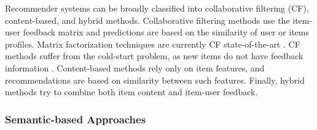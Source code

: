 Recommender systems can be broadly classified into collaborative filtering (CF), content-based, and hybrid methods. Collaborative filtering methods \citep{Koren2009} use the item-user feedback matrix and predictions are based on the similarity of user or items profiles. Matrix factorization techniques are currently CF state-of-the-art \citep{Koren2009}. 
CF methods suffer from the cold-start problem, as new items do not have feedback information \citep{Saveski2014}. Content-based methods \citep{Mooney1999} rely only on item features, and recommendations are based on similarity between such features. Finally, hybrid methods \citep{Burke2002} try to combine both item content and item-user feedback.


\subsubsection{Semantic-based Approaches}
\label{sec:SOA:mir:recommendation:semantic}


